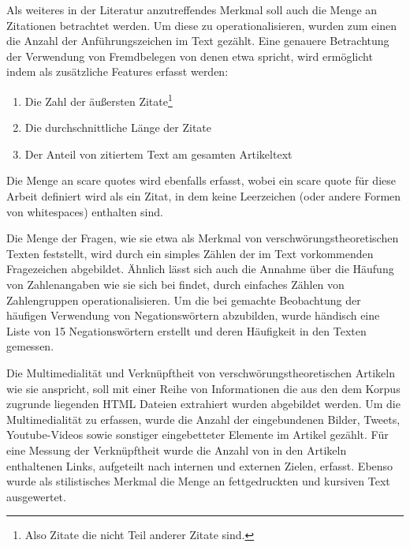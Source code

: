 Als weiteres in der Literatur anzutreffendes Merkmal soll auch die Menge an Zitationen betrachtet werden.
Um diese zu operationalisieren, wurden zum einen die Anzahl der Anführungszeichen im Text gezählt.
Eine genauere Betrachtung der Verwendung von Fremdbelegen von denen etwa \textcite[235]{schafer_2018} spricht, wird ermöglicht indem als zusätzliche Features erfasst werden:

\begin{enumerate}
    \item Die Zahl der äußersten Zitate\footnote{Also Zitate die nicht Teil anderer Zitate sind.}
    \item Die durchschnittliche Länge der Zitate
    \item Der Anteil von zitiertem Text am gesamten Artikeltext
\end{enumerate}

Die Menge an scare quotes wird ebenfalls erfasst, wobei ein scare quote für diese Arbeit definiert wird als ein Zitat, in dem keine Leerzeichen (oder andere Formen von whitespaces) enthalten sind.

Die Menge der Fragen, wie sie etwa \textcite[205]{filatkina_2018} als Merkmal von verschwörungstheoretischen Texten feststellt, wird durch ein simples Zählen der im Text vorkommenden Fragezeichen abgebildet.
Ähnlich lässt sich auch die Annahme über die Häufung von Zahlenangaben wie sie sich bei \textcite[234]{schafer_2018} findet, durch einfaches Zählen von Zahlengruppen operationalisieren.
Um die bei \textcite[149]{stumpf_2019} gemachte Beobachtung der häufigen Verwendung von Negationswörtern abzubilden, wurde händisch eine Liste von 15 Negationswörtern erstellt und deren Häufigkeit in den Texten gemessen.

Die Multimedialität und Verknüpftheit von verschwörungstheoretischen Artikeln wie sie \textcite[10]{soukup_2008} anspricht, soll mit einer Reihe von Informationen die aus den dem Korpus zugrunde liegenden HTML Dateien extrahiert wurden abgebildet werden.
Um die Multimedialität zu erfassen, wurde die Anzahl der eingebundenen Bilder, Tweets, Youtube-Videos sowie sonstiger eingebetteter Elemente im Artikel gezählt.
Für eine Messung der Verknüpftheit wurde die Anzahl von in den Artikeln enthaltenen Links, aufgeteilt nach internen und externen Zielen, erfasst.
Ebenso wurde als stilistisches Merkmal die Menge an fettgedruckten und kursiven Text ausgewertet.

